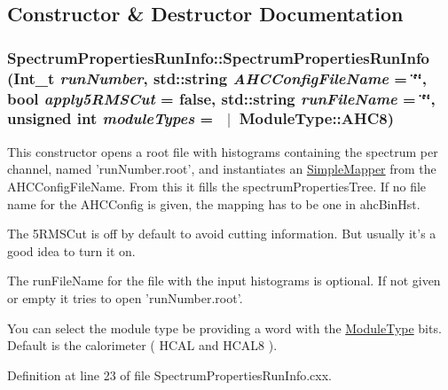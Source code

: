 \subsection{Constructor \& Destructor Documentation}
\hypertarget{class_spectrum_properties_run_info_a21d9494b3f2b982c546c240375fdc89b}{
\subsubsection[{SpectrumPropertiesRunInfo}]{\setlength{\rightskip}{0pt plus 5cm}SpectrumPropertiesRunInfo::SpectrumPropertiesRunInfo (Int\_\-t {\em runNumber}, \/  std::string {\em AHCConfigFileName} = {\ttfamily \char`\"{}\char`\"{}}, \/  bool {\em apply5RMSCut} = {\ttfamily false}, \/  std::string {\em runFileName} = {\ttfamily \char`\"{}\char`\"{}}, \/  unsigned int {\em moduleTypes} = {~$|$~{\bf ModuleType::AHC8}})}}
\label{class_spectrum_properties_run_info_a21d9494b3f2b982c546c240375fdc89b}


This constructor opens a root file with histograms containing the spectrum per channel, named 'runNumber.root', and instantiates an \hyperlink{class_simple_mapper}{SimpleMapper} from the AHCConfigFileName. From this it fills the spectrumPropertiesTree. If no file name for the AHCConfig is given, the mapping has to be one in ahcBinHst.

The 5RMSCut is off by default to avoid cutting information. But usually it's a good idea to turn it on.

The runFileName for the file with the input histograms is optional. If not given or empty it tries to open 'runNumber.root'.

You can select the module type be providing a word with the \hyperlink{class_module_type}{ModuleType} bits. Default is the calorimeter ( HCAL and HCAL8 ). 

Definition at line 23 of file SpectrumPropertiesRunInfo.cxx.

